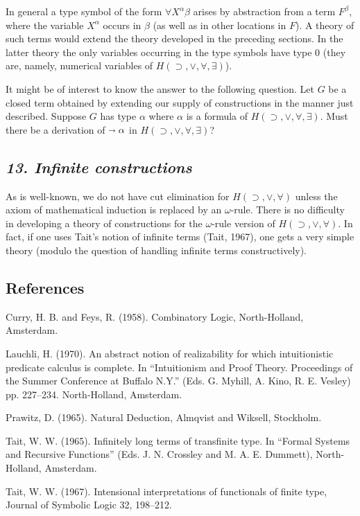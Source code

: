 \documentclass[12pt]{article}
\def\imp{\shortrightarrow}
\def\limp{\supset}
\def\a{\alpha}
\def\b{\beta}
\def\HIMP{H(\limp, \lor, \forall)}
\def\HIMPE{H(\limp, \lor, \forall, \exists)}
\begin{document}
In general a type symbol of the form $\forall X^ \a\b$ arises by abstraction from a term $F^\b$, where the variable $X^\a$ occurs in $\b$ (as well as in other locations in $F$). A theory of such terms would extend the theory developed in the preceding sections. In the latter theory the only variables occurring in the type symbols have type $0$ (they are, namely, numerical variables of $\HIMPE$).


It might be of interest to know the answer to the following question. Let $G$ be a closed term obtained by extending our supply of constructions in the manner just described. Suppose $G$ has type $\a$ where $\a$ is a formula of $\HIMPE$. Must there be a derivation of $\imp \a$ in $\HIMPE$?


\subsection*{\it 13. Infinite constructions}

As is well-known, we do not have cut elimination for $\HIMP$ unless the axiom of mathematical induction is replaced by an $\omega$-rule.
There is no difficulty in developing a theory of constructions for the $\omega$-rule version of $\HIMP$. 
In fact, if one uses Tait's notion of infinite terms (Tait, 1967), one gets a very simple theory (modulo the question of handling infinite terms constructively).

\newpage

\renewcommand{\refname}{}

\subsection*{\rm References}

\vskip-20pt

\begin{thebibliography}{9}


 Curry, H. B. and Feys, R. (1958). Combinatory Logic, North-Holland, Amsterdam.

 Lauchli, H. (1970). An abstract notion of realizability for which intuitionistic predicate calculus is complete. In ``Intuitionism and Proof Theory. Proceedings of the Summer Conference at Buﬀalo N.Y.'' (Eds. G. Myhill, A. Kino, R. E. Vesley) pp. 227–234. North-Holland, Amsterdam.

 Prawitz, D. (1965). Natural Deduction, Almqvist and Wiksell, Stockholm.

 Tait, W. W. (1965). Infinitely long terms of transfinite type. In ``Formal Systems and Recursive Functions'' (Eds. J. N. Crossley and M. A. E. Dummett), North-Holland, Amsterdam.

 Tait, W. W. (1967). Intensional interpretations of functionals of finite type, Journal of Symbolic Logic 32, 198–212.

\end{thebibliography}
\end{document}
